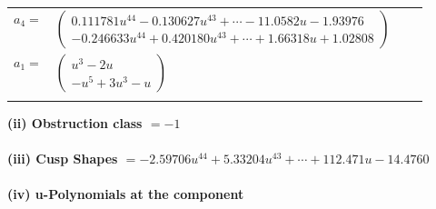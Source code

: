 \documentclass[1p]{elsarticle_modified}
\theoremstyle{definition}
\begin{document}
\begin{tabular}{m{7pt} m{180pt} m{7pt} m{180pt} }
\flushright $a_{4}=$&$\begin{pmatrix}0.111781 u^{44}-0.130627 u^{43}+\cdots-11.0582 u-1.93976\\-0.246633 u^{44}+0.420180 u^{43}+\cdots+1.66318 u+1.02808\end{pmatrix}$ \\
\flushright $a_{1}=$&$\begin{pmatrix}u^3-2 u\\- u^5+3 u^3- u\end{pmatrix}$\\&\end{tabular}
\flushleft \textbf{(ii) Obstruction class $= -1$}\\~\\
\flushleft \textbf{(iii) Cusp Shapes $= -2.59706 u^{44}+5.33204 u^{43}+\cdots+112.471 u-14.4760$}\\~\\
\newpage\renewcommand{\arraystretch}{1}
\flushleft \textbf{(iv) u-Polynomials at the component}\newline \\
\end{document}
